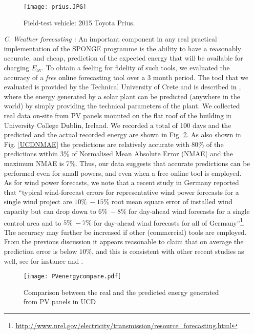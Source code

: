 \documentclass[journal]{IEEEtran}
\begin{document}
\begin{figure}[t]
	\centering
	\texttt{[image: prius.JPG]}
	\caption{Field-test vehicle:  2015 Toyota Prius.}\label{f1}
\end{figure}

{\em C. Weather forecasting :} An important component in any real practical implementation of the SPONGE programme is the ability to have a reasonably accurate, and cheap, prediction of the expected energy that will be available for charging $E_{\textrm{av}}$. To obtain a feeling for fidelity of such tools, we evaluated the accuracy of a {\em free}  online forecasting tool over a 3 month period. The tool that we evaluated is provided by the Technical University of Crete and is described in \cite{energyPredication}, where the energy generated by a solar plant can be predicted (anywhere in the world) by simply providing the technical parameters of the plant. We collected real data on-site from PV panels mounted on the flat roof of the building in University College Dublin, Ireland. We recorded a total of 100 days and the predicted and the actual recorded energy are shown in Fig. \ref{UCDNMAEbias}. As also shown in Fig. \ref{UCDNMAE} the predictions are relatively accurate with 80\% of the predictions within 3\% of Normalised Mean Absolute Error (NMAE) and the maximum NMAE is 7\%. Thus, our data suggests that accurate predictions can be performed even for small powers, and even when a free online tool is employed. As for wind power forecasts, we note that a recent study in Germany reported that ``typical wind-forecast errors for representative wind power forecasts for a single wind project are $10\%\ -15\%$ root mean square error of installed wind capacity but can drop down to $6\%\ -8\%$ for day-ahead wind forecasts for a single control area and to $5\%\ -7\%$ for day-ahead wind forecasts for all of Germany''\footnote{\url{http://www.nrel.gov/electricity/transmission/resource_forecasting.html}}. The accuracy may further be increased if other (commercial) tools are employed. From the previous discussion it appears reasonable to claim that on average the prediction error is below $10\%$, and this is consistent with other recent studies as well, see for instance \cite{wind} and \cite{solar}.


\begin{figure}[htbp]
	\begin{center}
		{\texttt{[image: PVenergycompare.pdf]}}
		\caption{Comparison between the real and the predicted energy generated from PV panels in UCD}
		\label{UCDNMAEbias}
	\end{center}
\end{figure}
\end{document}
